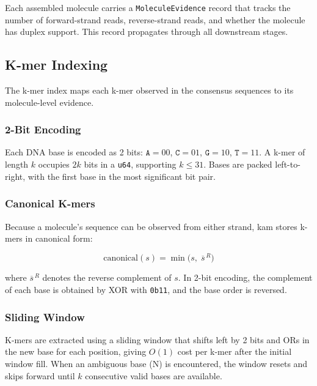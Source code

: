 Each assembled molecule carries a \texttt{MoleculeEvidence} record that tracks the number of forward-strand reads, reverse-strand reads, and whether the molecule has duplex support.
This record propagates through all downstream stages.

\subsection{K-mer Indexing}
\label{sec:method:index}

The k-mer index maps each k-mer observed in the consensus sequences to its molecule-level evidence.

\subsubsection{2-Bit Encoding}

Each DNA base is encoded as 2 bits: $\texttt{A}=00$, $\texttt{C}=01$, $\texttt{G}=10$, $\texttt{T}=11$.
A k-mer of length $k$ occupies $2k$ bits in a \texttt{u64}, supporting $k \le 31$.
Bases are packed left-to-right, with the first base in the most significant bit pair.

\subsubsection{Canonical K-mers}

Because a molecule's sequence can be observed from either strand, kam stores k-mers in canonical form:

\begin{equation}
  \label{eq:canonical-kmer}
  \text{canonical}(s) = \min\bigl(s, \;\overline{s}^{\,R}\bigr)
\end{equation}

\noindent where $\overline{s}^{\,R}$ denotes the reverse complement of $s$.
In 2-bit encoding, the complement of each base is obtained by XOR with \texttt{0b11}, and the base order is reversed.

\subsubsection{Sliding Window}

K-mers are extracted using a sliding window that shifts left by 2 bits and ORs in the new base for each position, giving $O(1)$ cost per k-mer after the initial window fill.
When an ambiguous base (N) is encountered, the window resets and skips forward until $k$ consecutive valid bases are available.

